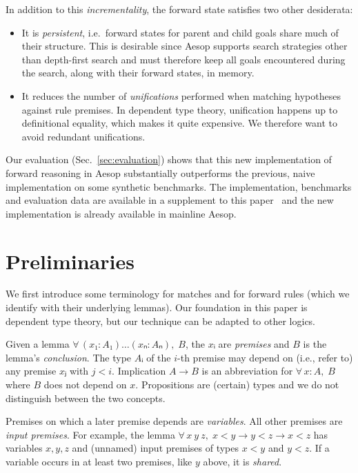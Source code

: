 \documentclass[runningheads,leqno]{llncs}
\newcommand{\All}[2]{\ensuremath{\forall\, #1,\; #2}}
\begin{document}
In addition to this \emph{incrementality}, the forward state satisfies two other desiderata:
\begin{itemize}
  \item It is \emph{persistent}, i.e.\ forward states for parent and child goals share much of their structure.
        This is desirable since Aesop supports search strategies other than depth-first search and must therefore keep all goals encountered during the search, along with their forward states, in memory.
  \item It reduces the number of \emph{unifications} performed when matching hypotheses against rule premises.
        In dependent type theory, unification happens up to definitional equality, which makes it quite expensive.
        We therefore want to avoid redundant unifications.
\end{itemize}

Our evaluation (Sec.~\ref{sec:evaluation}) shows that this new implementation of forward reasoning in Aesop substantially outperforms the previous, naive implementation on some synthetic benchmarks.
The implementation, benchmarks and evaluation data are available in a supplement to this paper~\cite{supplement} and the new implementation is already available in mainline Aesop.

\section{Preliminaries}

We first introduce some terminology for matches and for forward rules (which we identify with their underlying lemmas).
Our foundation in this paper is dependent type theory, but our technique can be adapted to other logics.

Given a lemma $\All{(x₁ : A₁) \dots (xₙ : Aₙ)}{B}$, the $xᵢ$ are \emph{premises} and $B$ is the lemma's \emph{conclusion}.
The type $Aᵢ$ of the $i$-th premise may depend on (i.e., refer to) any premise $xⱼ$ with $j < i$.
Implication $A → B$ is an abbreviation for $\All{x : A}{B}$ where $B$ does not depend on $x$.
Propositions are (certain) types and we do not distinguish between the two concepts.

Premises on which a later premise depends are \emph{variables}.
All other premises are \emph{input premises}.
For example, the lemma $\All{x~y~z}{x < y → y < z → x < z}$ has variables $x, y, z$ and (unnamed) input premises of types $x < y$ and $y < z$.
If a variable occurs in at least two premises, like $y$ above, it is \emph{shared}.
\end{document}
